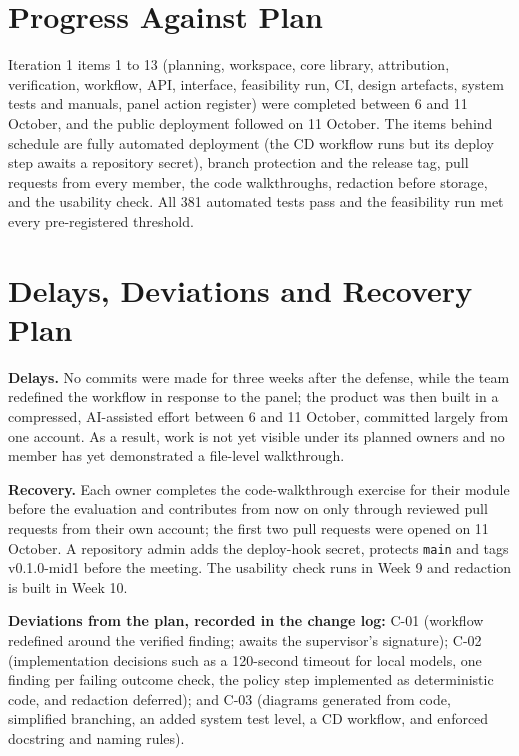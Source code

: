 \section{Progress Against Plan}

Iteration 1 items 1 to 13 (planning, workspace, core library, attribution, verification, workflow, API, interface, feasibility run, CI, design artefacts, system tests and manuals, panel action register) were completed between 6 and 11 October, and the public deployment followed on 11 October. The items behind schedule are fully automated deployment (the CD workflow runs but its deploy step awaits a repository secret), branch protection and the release tag, pull requests from every member, the code walkthroughs, redaction before storage, and the usability check. All 381 automated tests pass and the feasibility run met every pre-registered threshold.

\section{Delays, Deviations and Recovery Plan}

\textbf{Delays.} No commits were made for three weeks after the defense, while the team redefined the workflow in response to the panel; the product was then built in a compressed, AI-assisted effort between 6 and 11 October, committed largely from one account. As a result, work is not yet visible under its planned owners and no member has yet demonstrated a file-level walkthrough.

\textbf{Recovery.} Each owner completes the code-walkthrough exercise for their module before the evaluation and contributes from now on only through reviewed pull requests from their own account; the first two pull requests were opened on 11 October. A repository admin adds the deploy-hook secret, protects \texttt{main} and tags v0.1.0-mid1 before the meeting. The usability check runs in Week 9 and redaction is built in Week 10.

\textbf{Deviations from the plan, recorded in the change log:} C-01 (workflow redefined around the verified finding; awaits the supervisor's signature); C-02 (implementation decisions such as a 120-second timeout for local models, one finding per failing outcome check, the policy step implemented as deterministic code, and redaction deferred); and C-03 (diagrams generated from code, simplified branching, an added system test level, a CD workflow, and enforced docstring and naming rules).

